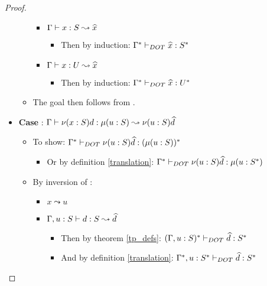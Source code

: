 \begin{proof}
\begin{itemize}
\begin{itemize}
            \begin{itemize}
                \item $\Gamma \vdash x: S \leadsto \widehat{x}$
                \begin{itemize}
                    \item Then by induction: 
                        $\Gamma^{*} \vdash_{DOT} \widehat{x}: S^{*}$
                \end{itemize}
                \item $\Gamma \vdash x: U \leadsto \widehat{x}$
                \begin{itemize}
                    \item Then by induction: 
                        $\Gamma^{*} \vdash_{DOT} \widehat{x}: U^{*}$
                \end{itemize}
            \end{itemize}
            \item The goal then follows from .
        \end{itemize}
        \item \textbf{Case} :
            $\Gamma \vdash \nu(x:S)d: \mu(u : S) \leadsto \nu(u:S)\widehat{d}$
        \begin{itemize}
            \item To show: $\Gamma^{*} \vdash_{DOT} \nu(u:S)\widehat{d}: (\mu(u : S))^{*}$
            \begin{itemize}
                \item Or by definition \ref{translation}:
                    $\Gamma^{*} \vdash_{DOT} \nu(u:S)\widehat{d}: \mu(u : S^{*})$
            \end{itemize}
            \item By inversion of :
            \begin{itemize}
                \item $x \leadsto u$
                \item $\Gamma, u: S \vdash d: S \leadsto \widehat{d}$
                \begin{itemize}
                    \item Then by theorem \ref{tp_defs}:
                        $(\Gamma, u: S)^{*} \vdash_{DOT} \widehat{d}: S^{*}$
                    \item And by definition \ref{translation}:
                        $\Gamma^{*}, u: S^{*} \vdash_{DOT} \widehat{d}: S^{*}$
                \end{itemize}

\end{itemize}
\end{itemize}
\end{itemize}
\end{proof}

